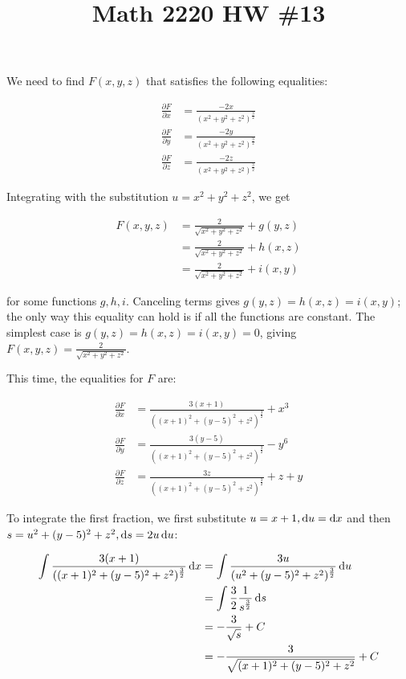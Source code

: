 

\title{Math 2220 HW \#13}
\author{\name}
\maketitle


We need to find $F(x, y, z)$ that satisfies the following equalities:

\begin{align*}
  \frac{\partial F}{\partial x} &= \frac{-2x}{(x^2 + y^2 + z^2)^{\frac{3}{2}}} \\
  \frac{\partial F}{\partial y} &= \frac{-2y}{(x^2 + y^2 + z^2)^{\frac{3}{2}}} \\
  \frac{\partial F}{\partial z} &= \frac{-2z}{(x^2 + y^2 + z^2)^{\frac{3}{2}}}
\end{align*}

Integrating with the substitution $u = x^2 + y^2 + z^2$, we get

\begin{align*}
  F(x, y, z) &= \frac{2}{\sqrt{x^2 + y^2 + z^2}} + g(y, z) \\
  &= \frac{2}{\sqrt{x^2 + y^2 + z^2}} + h(x, z) \\
  &= \frac{2}{\sqrt{x^2 + y^2 + z^2}} + i(x, y)
\end{align*}

for some functions $g, h, i$. Canceling terms gives $g(y, z) = h(x, z) = i(x, y)$; the only way this equality can hold is if all the functions are constant. The simplest case is $g(y, z) = h(x, z) = i(x, y) = 0$, giving $F(x, y, z) = \frac{2}{\sqrt{x^2 + y^2 + z^2}}$.

This time, the equalities for $F$ are:

\begin{align*}
  \frac{\partial F}{\partial x} &= \frac{3(x + 1)}{((x + 1)^2 + (y - 5)^2 + z^2)^{\frac{3}{2}}} + x^3 \\
  \frac{\partial F}{\partial y} &= \frac{3(y - 5)}{((x + 1)^2 + (y - 5)^2 + z^2)^{\frac{3}{2}}} - y^6 \\
  \frac{\partial F}{\partial z} &= \frac{3z}{((x + 1)^2 + (y - 5)^2 + z^2)^{\frac{3}{2}}} + z + y
\end{align*}

To integrate the first fraction, we first substitute $u = x + 1, \mathop{}\!\mathrm{d} u = \mathop{}\!\mathrm{d} x$ and then $s = u^2 + (y - 5)^2 + z^2, \mathop{}\!\mathrm{d} s = 2u \mathop{}\!\mathrm{d} u$:

\begin{align*}
  \int \frac{3(x + 1)}{((x + 1)^2 + (y - 5)^2 + z^2)^{\frac{3}{2}}} \mathop{}\!\mathrm{d} x &= \int \frac{3u}{(u^2 + (y - 5)^2 + z^2)^{\frac{3}{2}}} \mathop{}\!\mathrm{d} u \\
  &= \int \frac{3}{2} \frac{1}{s^{\frac{3}{2}}} \mathop{}\!\mathrm{d} s \\
  &= -\frac{3}{\sqrt{s}} + C \\
  &= -\frac{3}{\sqrt{(x + 1)^2 + (y - 5)^2 + z^2}} + C
\end{align*}

